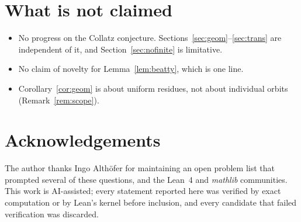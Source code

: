 \documentclass[11pt,a4paper]{article}
\theoremstyle{plain}
\theoremstyle{definition}
\begin{document}
\section{What is not claimed}

\begin{itemize}[nosep]
  \item No progress on the Collatz conjecture. Sections~\ref{sec:geom}--\ref{sec:trans} are
        independent of it, and Section~\ref{sec:nofinite} is limitative.
  \item No claim of novelty for Lemma~\ref{lem:beatty}, which is one line.
  \item Corollary~\ref{cor:geom} is about uniform residues, not about individual orbits
        (Remark~\ref{rem:scope}).
\end{itemize}

\section*{Acknowledgements}
The author thanks Ingo Alth\"ofer for maintaining an open problem list that prompted several
of these questions, and the Lean~4 and \emph{mathlib} communities. This work is AI-assisted;
every statement reported here was verified by exact computation or by Lean's kernel before
inclusion, and every candidate that failed verification was discarded.
\end{document}
